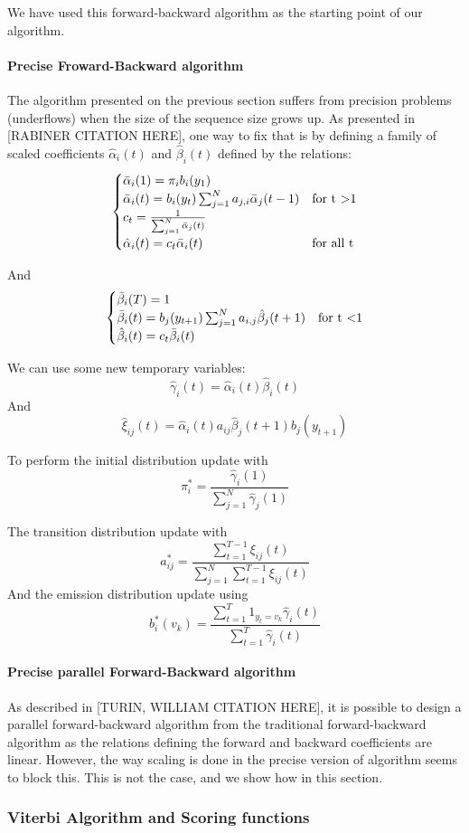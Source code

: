 We have used this forward-backward algorithm as the starting point of our algorithm.

\paragraph{Precise Froward-Backward algorithm}
The algorithm presented on the previous section suffers from precision problems (underflows) when the size of the sequence size grows up.
As presented in [RABINER CITATION HERE], one way to fix that is by defining a family of scaled coefficients $\hat{\alpha}_i(t)$ and $\hat{\beta}_i(t)$ defined by the relations:
\begin{equation}
\begin{cases}
\bar{\alpha}_i(1) = \pi_i b_i(y_1) & \\
\bar{\alpha}_i(t) = b_i(y_t)\sum_{j=1}^{N}{a_{j,i}\bar{\alpha}_j(t-1)} & \text{for t \textgreater 1} \\
c_t = \frac{1}{\sum^N_{j=1} \bar{\alpha}_j(t)} & \\
\hat{\alpha}_i(t) = c_t \bar{\alpha}_i(t) & \text{for all t}
\end{cases}
\end{equation}

And
\begin{equation}
\begin{cases}
\bar{\beta}_i(T) = 1 & \\
\bar{\beta}_i(t) = b_j(y_{t+1})\sum_{j=1}^{N}{a_{i,j}\hat{\beta}_j(t+1)} & \text{for t \textless 1} \\
\hat{\beta}_i(t) = c_t \bar{\beta}_i(t)
\end{cases}
\end{equation}

We can use some new temporary variables:
\[\hat{\gamma}_i(t) = \hat{\alpha}_i(t)\hat{\beta}_i(t)\]
And
\[\hat{\xi}_{ij}(t)= \hat{\alpha}_i(t) a_{ij} \hat{\beta}_j(t+1) b_j(y_{t+1})\]

To perform the initial distribution update with
\[\pi_i^* = \frac{\hat{\gamma}_i(1)}{\sum_{j=1}^{N}\hat{\gamma}_j(1)}\]

The transition distribution update with
\[a_{ij}^*=\frac{\sum^{T-1}_{t=1}\xi_{ij}(t)}{\sum^{N}_{j=1}\sum^{T-1}_{t=1}\xi_{ij}(t)}\]
And the emission distribution update using
\[b_i^*(v_k)=\frac{\sum^T_{t=1} 1_{y_t=v_k} \hat{\gamma}_i(t)}{\sum^T_{t=1} \hat{\gamma}_i(t)}\]

\paragraph{Precise parallel Forward-Backward algorithm}
As described in [TURIN, WILLIAM CITATION HERE], it is possible to design a parallel forward-backward algorithm from the traditional forward-backward algorithm as the relations defining the forward and backward coefficients are linear. However, the way scaling is done in the precise version of algorithm seems to block this. This is not the case, and we show how in this section.


\subsubsection{Viterbi Algorithm and Scoring functions}


